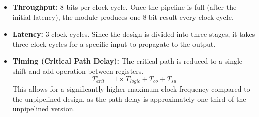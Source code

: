 \documentclass[11pt, letterpaper]{article}
\begin{document}
\begin{itemize}
    \item \textbf{Throughput:} 8 bits per clock cycle. Once the pipeline is full (after the initial latency), the module produces one 8-bit result every clock cycle.
    \item \textbf{Latency:} 3 clock cycles. Since the design is divided into three stages, it takes three clock cycles for a specific input to propagate to the output.
    \item \textbf{Timing (Critical Path Delay):} The critical path is reduced to a single shift-and-add operation between registers.
    \[ T_{crit} = 1 \times T_{logic} + T_{co} + T_{su} \]
    This allows for a significantly higher maximum clock frequency compared to the unpipelined design, as the path delay is approximately one-third of the unpipelined version.
\end{itemize}
\end{document}
